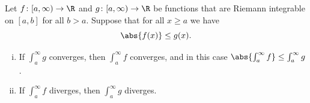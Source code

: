 \documentclass[12pt]{book}
\begin{document}
\begin{prop}
Let
$f \colon [a,\infty) \to \R$ and
$g \colon [a,\infty) \to \R$ be functions
that are Riemann integrable on $[a,b]$ for all $b > a$.
 Suppose
that for all $x \geq a$ we have
\begin{equation*}
\abs{f(x)} \leq g(x) .
\end{equation*}
\begin{enumerate}[(i)]
\item If $\int_a^\infty g$ converges, then $\int_a^\infty f$ converges,
and in this case 
$\abs{\int_a^\infty f} \leq \int_a^\infty g$.
\item If $\int_a^\infty f$ diverges, then $\int_a^\infty g$ diverges.
\end{enumerate}
\end{prop}
\end{document}
